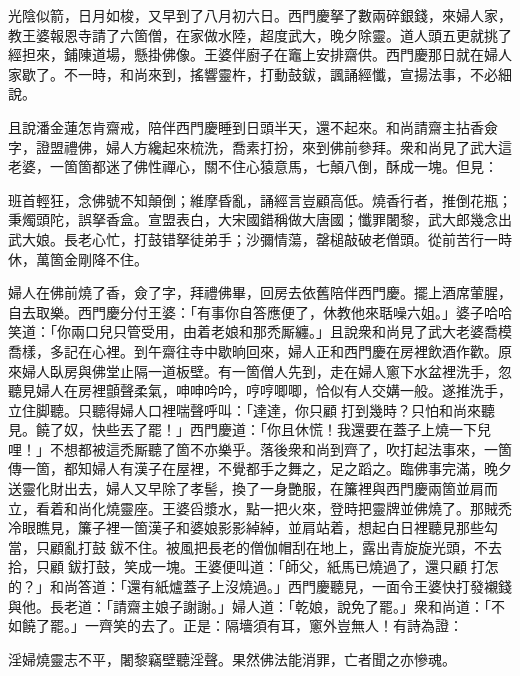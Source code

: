 光陰似箭，日月如梭，又早到了八月初六日。西門慶拏了數兩碎銀錢，來婦人家，教王婆報恩寺請了六箇僧，在家做水陸，超度武大，晚夕除靈。道人頭五更就挑了經担來，鋪陳道場，懸掛佛像。王婆伴廚子在竈上安排齋供。西門慶那日就在婦人家歇了。不一時，和尚來到，搖響靈杵，打動鼓鈸，諷誦經懺，宣揚法事，不必細說。

且說潘金蓮怎肯齋戒，陪伴西門慶睡到日頭半天，還不起來。和尚請齋主拈香僉字，證盟禮佛，婦人方纔起來梳洗，喬素打扮，來到佛前參拜。衆和尚見了武大這老婆，一箇箇都迷了佛性禪心，關不住心猿意馬，七顛八倒，酥成一塊。但見：

\begin{myquote} 
班首輕狂，念佛號不知顛倒；維摩昏亂，誦經言豈顧高低。燒香行者，推倒花瓶；秉燭頭陀，誤拏香盒。宣盟表白，大宋國錯稱做大唐國；懺罪闍黎，武大郎幾念出武大娘。長老心忙，打鼓错拏徒弟手；沙彌情蕩，罄槌敲破老僧頭。從前苦行一時休，萬箇金剛降不住。
\end{myquote} 

婦人在佛前燒了香，僉了字，拜禮佛畢，回房去依舊陪伴西門慶。擺上酒席葷腥，自去取樂。西門慶分付王婆：「有事你自答應便了，休教他來聒噪六姐。」婆子哈哈笑道：「你兩口兒只管受用，由着老娘和那禿厮纏。」{}且說衆和尚見了武大老婆喬模喬樣，多記在心裡。到午齋往寺中歇晌回來，婦人正和西門慶在房裡飲酒作歡。原來婦人臥房與佛堂止隔一道板壁。有一箇僧人先到，走在婦人窻下水盆裡洗手，忽聽見婦人在房裡顫聲柔氣，呻呻吟吟，哼哼唧唧，恰似有人交媾一般。遂推洗手，立住脚聽。{}{}只聽得婦人口裡喘聲呼叫：「達達，你只顧𢵞打到幾時？只怕和尚來聽見。饒了奴，快些丟了罷！」西門慶道：「你且休慌！我還要在蓋子上燒一下兒哩！」不想都被這禿厮聽了箇不亦樂乎。落後衆和尚到齊了，吹打起法事來，一箇傳一箇，都知婦人有漢子在屋裡，不覺都手之舞之，足之蹈之。臨佛事完滿，晚夕送靈化財出去，婦人又早除了孝髻，換了一身艷服，在簾裡與西門慶兩箇並肩而立，看着和尚化燒靈座。王婆舀漿水，點一把火來，登時把靈牌並佛燒了。那賊禿冷眼瞧見，簾子裡一箇漢子和婆娘影影綽綽，並肩站着，想起白日裡聽見那些勾當，只顧亂打鼓𢵞鈸不住。被風把長老的僧伽帽刮在地上，露出青旋旋光頭，不去拾，只顧𢵞鈸打鼓，笑成一塊。{}王婆便叫道：「師父，紙馬已燒過了，還只顧𢵞打怎的？」和尚答道：「還有紙爐蓋子上沒燒過。」西門慶聽見，一面令王婆快打發襯錢與他。長老道：「請齋主娘子謝謝。」婦人道：「乾娘，說免了罷。」衆和尚道：「不如饒了罷。」一齊笑的去了。正是：隔墻須有耳，窻外豈無人！有詩為證：

\begin{myquote} 
淫婦燒靈志不平，闍黎竊壁聽淫聲。果然佛法能消罪，亡者聞之亦慘魂。
\end{myquote} 

